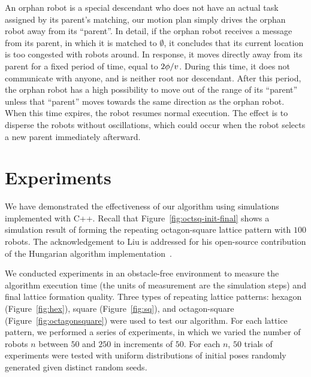 An orphan robot is a special descendant who does not have an actual task assigned by its parent's matching, our motion plan simply drives the orphan robot away from its ``parent''. 
%
In detail, if the orphan robot receives a message from its parent, in which it is matched to $\emptyset$, it concludes that its current location is too congested with robots around.
%
In response, it moves directly away from its parent for a fixed period of time, equal to $2\phi/v$.
%
During this time, it does not communicate with anyone, and is neither root nor descendant. 
%
After this period, the orphan robot has a high possibility to move out of the range of its ``parent'' unless that ``parent'' moves towards the same direction as the orphan robot.
%
When this time expires, the robot resumes normal execution. 
%
The effect is to disperse the robots without oscillations, which could occur when the robot selects a new parent immediately afterward.
%     

\section{Experiments}
\label{sec:mrf-exp}
We have demonstrated the effectiveness of our algorithm using simulations implemented with C++. 
%
Recall that Figure~\ref{fig:octsq-init-final} shows a simulation result of forming the repeating octagon-square lattice pattern with $100$ robots.
%
The acknowledgement to Liu is addressed for his open-source contribution of the Hungarian algorithm implementation~\cite{LiuShe11, LiuShe12a}.


We conducted experiments in an obstacle-free environment to measure the algorithm execution time (the units of measurement are the simulation steps) and final lattice formation quality. 
%
Three types of repeating lattice patterns: hexagon (Figure~\ref{fig:hex}), square (Figure~\ref{fig:sq}), and octagon-square (Figure~\ref{fig:octagonsquare}) were used to test our algorithm.
%
For each lattice pattern, we performed a series of experiments, in which we varied the number of robots $n$ between $50$ and $250$ in increments of $50$.  
%
For each $n$, $50$ trials of experiments were tested with uniform distributions of initial poses randomly generated given distinct random seeds.

